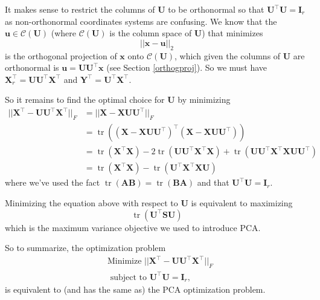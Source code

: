 \documentclass[]{book}
\theoremstyle{definition}
\theoremstyle{definition}
\theoremstyle{definition}
\theoremstyle{remark}
\begin{document}
It makes sense to restrict the columns of \(\boldsymbol U\) to be orthonormal so that \(\boldsymbol U^\top \boldsymbol U=\mathbf I_r\) as non-orthonormal coordinates systems are confusing. We know that the \(\boldsymbol u\in \mathcal{C}(\boldsymbol U)\) (where \(\mathcal{C}(\boldsymbol U)\) is the column space of \(\boldsymbol U\)) that minimizes
\[||\boldsymbol x-\boldsymbol u||_2\]
is the orthogonal projection of \(\boldsymbol x\) onto \(\mathcal{C}(\boldsymbol U)\), which given the columns of \(\boldsymbol U\) are orthonormal is \(\boldsymbol u= \boldsymbol U\boldsymbol U^\top \boldsymbol x\) (see Section \ref{orthogproj}). So we must have \(\boldsymbol X_r^\top = \boldsymbol U\boldsymbol U^\top \boldsymbol X^\top\) and \(\boldsymbol Y^\top = \boldsymbol U^\top \boldsymbol X^\top\).

So it remains to find the optimal choice for \(\boldsymbol U\) by minimizing
\begin{align*}
||\boldsymbol X^\top - \boldsymbol U\boldsymbol U^\top \boldsymbol X^\top||_F &=||\boldsymbol X- \boldsymbol X\boldsymbol U\boldsymbol U^\top ||_F\\
&= \operatorname{tr}((\boldsymbol X- \boldsymbol X\boldsymbol U\boldsymbol U^\top)^\top(\boldsymbol X- \boldsymbol X\boldsymbol U\boldsymbol U^\top))\\
&= \operatorname{tr}(\boldsymbol X^\top \boldsymbol X) - 2 \operatorname{tr}(\boldsymbol U\boldsymbol U^\top \boldsymbol X^\top\boldsymbol X) +  \operatorname{tr}(\boldsymbol U\boldsymbol U^\top \boldsymbol X^\top\boldsymbol X\boldsymbol U\boldsymbol U^\top)\\
&= \operatorname{tr}(\boldsymbol X^\top \boldsymbol X)  - \operatorname{tr}(\boldsymbol U^\top \boldsymbol X^\top \boldsymbol X\boldsymbol U) 
\end{align*}
where we've used the fact \(\operatorname{tr}(\boldsymbol A\boldsymbol B) = \operatorname{tr}(\boldsymbol B\boldsymbol A)\) and that \(\boldsymbol U^\top \boldsymbol U=\mathbf I_r\).

Minimizing the equation above with respect to \(\boldsymbol U\) is equivalent to maximizing
\[\operatorname{tr}(\boldsymbol U^\top \boldsymbol S\boldsymbol U) \]
which is the maximum variance objective we used to introduce PCA.

So to summarize, the optimization problem
\begin{align*}
&\mbox{Minimize } ||\boldsymbol X^\top -\boldsymbol U\boldsymbol U^\top \boldsymbol X^\top||_F \\
 &\mbox{ subject to } \boldsymbol U^\top \boldsymbol U=\mathbf I_r,
 \end{align*}
is equivalent to (and has the same as) the PCA optimization problem.
\end{document}
